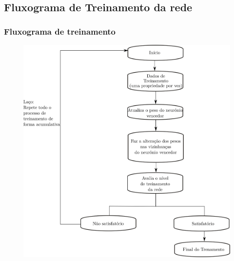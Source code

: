\documentclass[aspectratio=10]{beamer} %
\begin{document}
\subsection{Fluxograma de Treinamento da rede}
\begin{frame}
\frametitle{Fluxograma de treinamento}
\begin{scriptsize}


\begin{figure}[H]
\centering

\includegraphics[scale=0.35]{Imagens/treinamento.png}
\end{figure}
\end{scriptsize}
\end{frame}
\end{document}
